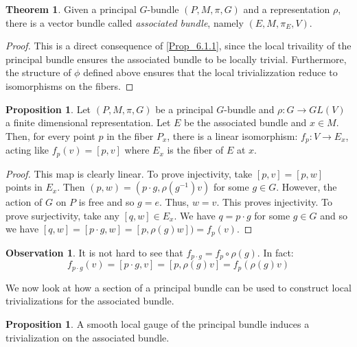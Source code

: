 \documentclass[12pt,a4paper]{report}
\theoremstyle{definition}
\theoremstyle{Theorem}
\newtheorem{Theo}[Def]{Theorem}
\newtheorem{Prop}[Def]{Proposition}
\theoremstyle{definition}
\theoremstyle{definition}
\newtheorem{Obs}[Def]{Observation}
\begin{document}
	\begin{Theo}
		Given a principal $G$-bundle $(P,M,\pi,G)$ and a representation $\rho$, there is a vector bundle called \textit{associated bundle}, namely $(E,M,\pi_E,V)$.
	\end{Theo}
	\begin{proof}
		\begin{comment}
			The proof follows from proposition \ref{Prop_6.1.1}. In fact the principal bundle is locally trivial and this implies that the associated bundle is locally trivial as well, with fiber $V$
		\end{comment}
		This is a direct consequence of \ref{Prop_6.1.1}, since the local trivaility of the principal bundle ensures the associated bundle to be locally trivial. Furthermore, the structure of $\phi$ defined above ensures that the local trivializzation reduce to isomorphisms on the fibers.
	\end{proof}
	\begin{Prop}\label{Prop_6.2.2}
		Let $(P,M,\pi,G)$ be a principal $G$-bundle and $\rho:G\rightarrow GL(V)$ a finite dimensional representation. Let $E$ be the associated bundle and $x\in M$. Then, for every point $p$ in the fiber $P_x$, there is a linear isomorphism:
		$f_p:V\rightarrow E_x$, acting like $f_p(v)=[p,v]$ where $E_x$ is the fiber of $E$ at $x$.
	\end{Prop}
	\begin{proof}
		This map is clearly linear. To prove injectivity, take $[p,v]=[p,w]$ points in $E_x$. Then $(p,w)=(p\cdot g,\rho(g^{-1})v)$ for some $g\in G$. However, the action of $G$ on $P$ is free and so $g=e$. Thus, $w=v$. This proves injectivity. To prove surjectivity, take any $[q,w]\in E_x$. We have $q=p\cdot g$ for some $g\in G$ and so we have $[q,w]=[p\cdot g,w]=[p,\rho(g)w])=f_p(v)$.
	\end{proof}
	\begin{Obs}\label{Obs_6.2.3}
		It is not hard to see that $f_{p\cdot g}=f_p\circ \rho(g)$. In fact:
		$$f_{p\cdot g}(v)=[p\cdot g,v]=[p,\rho(g)v]=f_p(\rho(g)v)$$
	\end{Obs}
	We now look at how a section of a principal bundle can be used to construct local trivializations for the associated bundle.
	\begin{Prop}\label{Prop_6.2.3}
		A smooth local gauge of the principal bundle induces a trivialization on the associated bundle.
	\end{Prop}
\end{document}
